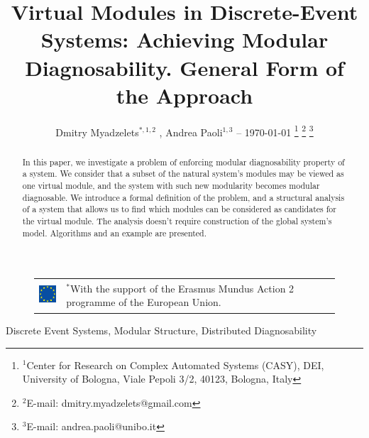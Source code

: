 \documentclass[a4paper, 10pt, conference]{ieeeconf}
\begin{document}
\title{Virtual Modules in Discrete-Event Systems: 
Achieving Modular Diagnosability. General Form of the Approach}
\author{
	Dmitry Myadzelets$^{*,1,2}$
	, Andrea Paoli$^{1,3}$
	-- \today
	\thanks{$^{1}$Center for Research on Complex Automated Systems (CASY), DEI,
	University of Bologna, Viale Pepoli 3/2, 40123, Bologna, Italy}
		\thanks{$^{2}$E-mail: {dmitry.myadzelets@gmail.com}}
		\thanks{$^{3}$E-mail: {andrea.paoli@unibo.it}}
}
\maketitle

\begin{figure}[!b]
\begin{tabular}{l p{60mm}}
 	\includegraphics[height=10mm]{EU_flag.eps}
 	& \vspace{-10mm} \footnotesize
 	$^{*}$With the support of the Erasmus Mundus Action 2 programme of the
 	European Union.
\end{tabular}
\end{figure}

\begin{abstract} In this paper, we investigate a problem of enforcing modular
diagnosability property of a system. We consider that a subset of the natural
system's modules may be viewed as one virtual module, and the system with such
new modularity becomes modular diagnosable. We introduce a formal definition of
the problem, and a structural analysis of a system that allows us to find which
modules can be considered as candidates for the virtual module. The analysis
doesn't require construction of the global system's model. Algorithms and an
example are presented.
\end{abstract}

\begin{keywords}
Discrete Event Systems, Modular Structure, Distributed Diagnosability
\end{keywords}

\newtheorem{theorem}{Theorem}
\newtheorem{definition}{Definition}
\newtheorem{lemma}{Lemma}
\newtheorem{assumption}{Assumption}
\newtheorem{corollary}{Corollary}
\newtheorem{example}{Example}
\end{document}
